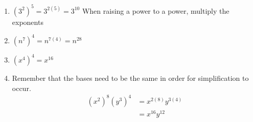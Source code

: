 \begin{myProof}
	\begin{enumerate}
		\item $(3^2)^5=3^{2(5)}=3^{10}$  \hfill When raising a power to a power, multiply the exponents
		\item $(n^7)^4 = n^{7(4)} = n^{28}$
		\item $(x^4)^4 = x^{16}$
		\item Remember that the bases need to be the same in order for simplification to occur.
		\begin{align*}
			(x^2)^8 (y^3)^4 & =   x^{2(8)} y^{3(4)} \\
			                & =   x^{16} y^{12}     
		\end{align*} 
	\end{enumerate}
\end{myProof}
